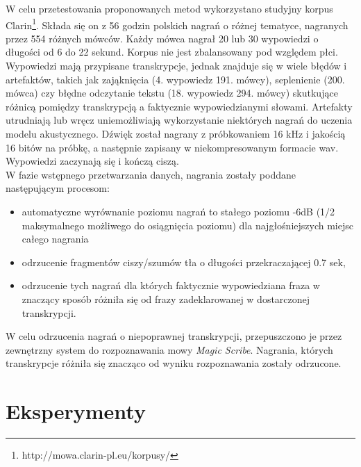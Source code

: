 \documentclass[11pt]{article}
\begin{document}
	W celu przetestowania proponowanych metod wykorzystano studyjny korpus Clarin\footnote{http://mowa.clarin-pl.eu/korpusy/}. Składa się on z 56 godzin polskich nagrań o różnej tematyce, nagranych przez 554 różnych mówców. Każdy mówca nagrał 20 lub 30 wypowiedzi o długości od 6 do 22 sekund. Korpus nie jest zbalansowany pod względem płci. Wypowiedzi mają przypisane transkrypcje, jednak znajduje się w wiele błędów i artefaktów, takich jak zająknięcia (4. wypowiedz 191. mówcy), seplenienie (200. mówca) czy błędne odczytanie tekstu (18. wypowiedz 294. mówcy) skutkujące różnicą pomiędzy transkrypcją a faktycznie wypowiedzianymi słowami. Artefakty utrudniają lub wręcz uniemożliwiają wykorzystanie niektórych nagrań do uczenia modelu akustycznego. Dźwięk został nagrany z próbkowaniem 16 kHz i jakością 16 bitów na próbkę, a następnie zapisany w niekompresowanym formacie wav. Wypowiedzi zaczynają się i kończą ciszą. 
\\
W fazie wstępnego przetwarzania danych, nagrania zostały poddane następującym procesom:
\begin{itemize}
	\item automatyczne wyrównanie poziomu nagrań to stałego poziomu -6dB (1/2 maksymalnego możliwego do osiągnięcia poziomu) dla najgłośniejszych miejsc całego nagrania
	\item odrzucenie fragmentów ciszy/szumów tła o długości przekraczającej 0.7 sek,
	\item odrzucenie tych nagrań dla których faktycznie wypowiedziana fraza w znaczący sposób różniła się od frazy zadeklarowanej w dostarczonej transkrypcji.
\end{itemize}
W celu odrzucenia nagrań o niepoprawnej transkrypcji, przepuszczono je przez zewnętrzny system do rozpoznawania mowy \textit{Magic Scribe}. Nagrania, których transkrypcje różniła się znacząco od wyniku rozpoznawania zostały odrzucone.

\section{Eksperymenty}
\label{sec:experiments}
\end{document}
